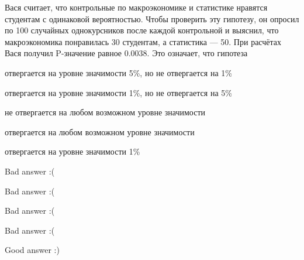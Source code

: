 
\begin{question}
Вася считает, что контрольные по макроэкономике и статистике нравятся
студентам с одинаковой вероятностью. Чтобы проверить эту гипотезу, он
опросил по 100 случайных однокурсников после каждой контрольной и
выяснил, что макроэкономика понравилась 30 студентам, а статистика ---
50. При расчётах Вася получил P-значение равное 0.0038. Это означает,
что гипотеза
\begin{answerlist}
  \item отвергается на уровне значимости 5\%, но не отвергается на 1\%
  \item отвергается на уровне значимости 1\%, но не отвергается на 5\%
  \item не отвергается на любом возможном уровне значимости
  \item отвергается на любом возможном уровне значимости
  \item отвергается на уровне значимости 1\%
\end{answerlist}
\end{question}

\begin{solution}
\begin{answerlist}
  \item Bad answer :(
  \item Bad answer :(
  \item Bad answer :(
  \item Bad answer :(
  \item Good answer :)
\end{answerlist}
\end{solution}

